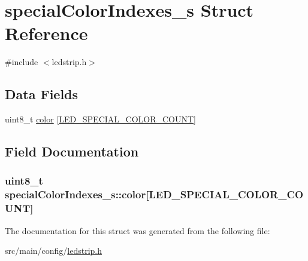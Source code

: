 \hypertarget{structspecialColorIndexes__s}{\section{special\+Color\+Indexes\+\_\+s Struct Reference}
\label{structspecialColorIndexes__s}
}


{\ttfamily \#include $<$ledstrip.\+h$>$}

\subsection*{Data Fields}
\begin{DoxyCompactItemize}
\item 
uint8\+\_\+t \hyperlink{structspecialColorIndexes__s_a6b3c35ea28d17be02d78dd1865ebddb5}{color} \mbox{[}\hyperlink{config_2ledstrip_8h_acf2ceddfc923060f2f67258134d4be61}{L\+E\+D\+\_\+\+S\+P\+E\+C\+I\+A\+L\+\_\+\+C\+O\+L\+O\+R\+\_\+\+C\+O\+U\+N\+T}\mbox{]}
\end{DoxyCompactItemize}


\subsection{Field Documentation}
\hypertarget{structspecialColorIndexes__s_a6b3c35ea28d17be02d78dd1865ebddb5}{
\subsubsection[{color}]{\setlength{\rightskip}{0pt plus 5cm}uint8\+\_\+t special\+Color\+Indexes\+\_\+s\+::color\mbox{[}{\bf L\+E\+D\+\_\+\+S\+P\+E\+C\+I\+A\+L\+\_\+\+C\+O\+L\+O\+R\+\_\+\+C\+O\+U\+N\+T}\mbox{]}}}\label{structspecialColorIndexes__s_a6b3c35ea28d17be02d78dd1865ebddb5}


The documentation for this struct was generated from the following file\+:\begin{DoxyCompactItemize}
\item 
src/main/config/\hyperlink{config_2ledstrip_8h}{ledstrip.\+h}\end{DoxyCompactItemize}
